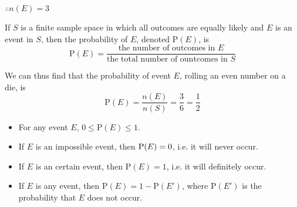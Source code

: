 \documentclass[11pt,a4paper]{book}
\begin{document}
$\therefore n\left(E\right)=3$

\medskip

\begin{tcolorbox}[colback=blue!5, colframe=black, boxrule=.4pt, sharpish corners]

If $S$ is a finite sample space in which all outcomes are equally
likely and $E$ is an event in $S$, then the probability of $E$,
denoted $\text{P}\left(E\right)$, is
\[
\text{P}\left(E\right)=\frac{\text{the number of outcomes in }E}{\text{the total number of ountcomes in }S}
\]
\end{tcolorbox}

\medskip

We can thus find that the probability of event $E$, rolling an even
number on a die, is
\[
\text{P}\left(E\right)=\frac{n\left(E\right)}{n\left(S\right)}=\frac{3}{6}=\frac{1}{2}
\]

\begin{itemize}
\item For any event $E$, $0\leq\text{P}\left(E\right)\leq1$.
\item If $E$ is an impossible event, then $\text{\text{P}\ensuremath{\left(E\right)}}=0$,
i.e. it will never occur.
\item If $E$ is an certain event, then $\text{P}\left(E\right)=1$, i.e.
it will definitely occur.
\item If $E$ is any event, then $\text{P}\left(E\right)=1-\text{P}\left(E'\right)$,
where $\text{P}\left(E'\right)$ is the probability that $E$ does
not occur.
\end{itemize}
\setlength{\extrarowheight}{6pt}

\begin{flushright}

\par\end{flushright}
\end{document}
